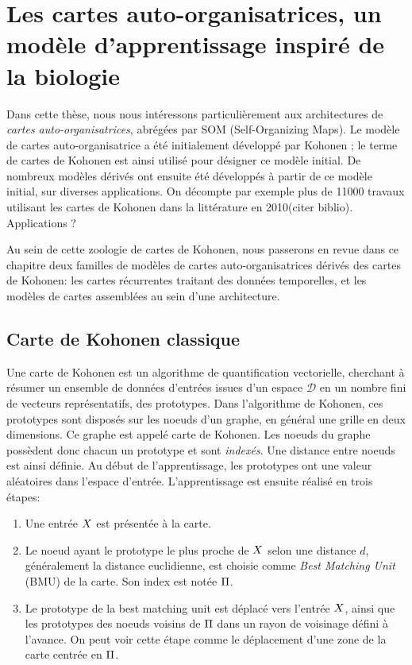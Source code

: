 \section{Les cartes auto-organisatrices, un modèle d'apprentissage inspiré de la biologie}\label{sec:som001}

Dans cette thèse, nous nous intéressons particulièrement aux architectures de \emph{cartes auto-organisatrices}, abrégées par SOM (Self-Organizing Maps). Le modèle de cartes auto-organisatrice a été initialement développé par Kohonen \cite{Kohonen1982}; le terme de cartes de Kohonen est ainsi utilisé pour désigner ce modèle initial. De nombreux modèles dérivés ont ensuite été développés à partir de ce modèle initial, sur diverses applications. On décompte par exemple plus de 11000 travaux utilisant les cartes de Kohonen dans la littérature en 2010(citer biblio).
Applications ?

Au sein de cette zoologie de cartes de Kohonen, nous passerons en revue dans ce chapitre deux familles de modèles de cartes auto-organisatrices dérivés des cartes de Kohonen: les cartes récurrentes traitant des données temporelles, et les modèles de cartes assemblées au sein d'une architecture.
\subsection{Carte de Kohonen classique}

Une carte de Kohonen est un algorithme de quantification vectorielle, cherchant à résumer un ensemble de données d'entrées issues d'un espace $\mathcal{D}$ en un nombre fini de vecteurs représentatifs, des prototypes.  Dans l'algorithme de Kohonen, ces prototypes sont disposés sur les noeuds d'un graphe, en général une grille en deux dimensions. Ce graphe est appelé carte de Kohonen. Les noeuds du graphe possèdent donc chacun un prototype et sont \emph{indexés}. Une distance entre noeuds est ainsi définie.
Au début de l'apprentissage, les prototypes ont une valeur aléatoires dans l'espace d'entrée. L'apprentissage est ensuite réalisé en trois étapes:
\begin{enumerate}
\item Une entrée $X$ est présentée à la carte.
\item Le noeud ayant le prototype le plus proche de $X$ selon une distance $d$, généralement la distance euclidienne, est choisie comme \emph{Best Matching Unit} (BMU) de la carte. Son index est notée $\Pi$.
\item Le prototype de la best matching unit est déplacé vers l'entrée $X$, ainsi que les prototypes des noeuds voisins de $\Pi$ dans un rayon de voisinage défini à l'avance. On peut voir cette étape comme le déplacement d'une zone de la carte centrée en $\Pi$.
\end{enumerate}

